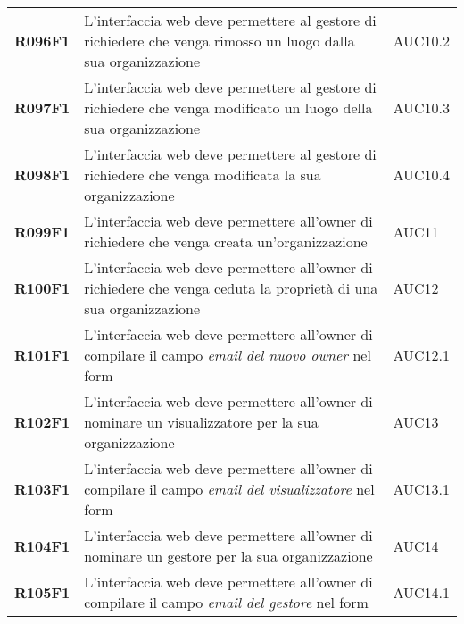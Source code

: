 \documentclass[../analisi-dei-requisiti]{subfiles}
\begin{document}
\begin{longtable}[H]{>{\centering\bfseries}m{3cm} >{\centering}m{10cm} >{\centering\arraybackslash}m{3cm}}
  R096F1                  & L'interfaccia web deve permettere al gestore di richiedere che venga rimosso un luogo dalla sua organizzazione                                 & AUC10.2                       \\
  R097F1                  & L'interfaccia web deve permettere al gestore di richiedere che venga modificato un luogo della sua organizzazione                              & AUC10.3                       \\
  R098F1                  & L'interfaccia web deve permettere al gestore di richiedere che venga modificata la sua organizzazione                                          & AUC10.4                       \\
  R099F1                  & L'interfaccia web deve permettere all'owner di richiedere che venga creata un'organizzazione                                                   & AUC11                         \\
  R100F1                  & L'interfaccia web deve permettere all'owner di richiedere che venga ceduta la proprietà di una sua organizzazione                              & AUC12                         \\
  R101F1                  & L'interfaccia web deve permettere all'owner di compilare il campo \textit{email del nuovo owner} nel form                                      & AUC12.1                       \\
  R102F1                  & L'interfaccia web deve permettere all'owner di nominare un visualizzatore per la sua organizzazione                                            & AUC13                         \\
  R103F1                  & L'interfaccia web deve permettere all'owner di compilare il campo \textit{email del visualizzatore} nel form                                   & AUC13.1                       \\
  R104F1                  & L'interfaccia web deve permettere all'owner di nominare un gestore per la sua organizzazione                                                   & AUC14                         \\
  R105F1                  & L'interfaccia web deve permettere all'owner di compilare il campo \textit{email del gestore} nel form                                          & AUC14.1                       \\
\end{longtable}
\end{document}

